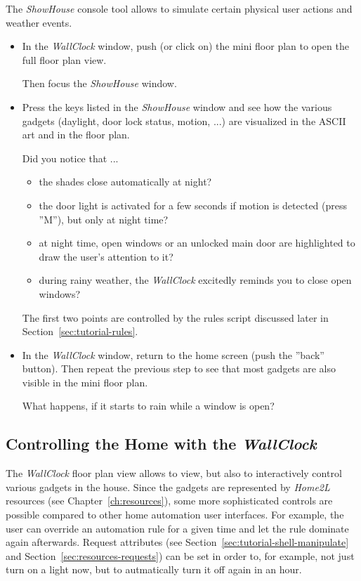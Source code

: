 \documentclass[12pt,english,parskip=half,headheight=19pt]{scrreprt}
\begin{document}
The \textit{ShowHouse} console tool allows to simulate certain physical user actions and weather events.

\begin{itemize}[$\blacktriangleright$]

  \item
    In the \textit{WallClock} window, push (or click on) the mini floor plan to open the full floor
    plan view.

    Then focus the \textit{ShowHouse} window.

  \item
    Press the keys listed in the \textit{ShowHouse} window and see how the various gadgets
    (daylight, door lock status, motion, ...) are visualized in the ASCII art and in the floor plan.

    Did you notice that ...
    \begin{itemize}
      \item the shades close automatically at night?
      \item the door light is activated for a few seconds if motion is detected (press ''M''),
        but only at night time?
      \item at night time, open windows or an unlocked main door are highlighted to draw the
        user's attention to it?
      \item during rainy weather, the \textit{WallClock} excitedly reminds you to close open windows?
    \end{itemize}

    The first two points are controlled by the rules script discussed later in
    Section~\ref{sec:tutorial-rules}.

  \item
    In the \textit{WallClock} window, return to the home screen (push the ''back'' button).
    Then repeat the previous step to see that most gadgets are also visible in the
    mini floor plan.

    What happens, if it starts to rain while a window is open?

\end{itemize}


\subsection{Controlling the Home with the \textit{WallClock}}
\label{sec:tutorial-firststeps-dialogs}

The \textit{WallClock} floor plan view allows to view, but also to interactively control various
gadgets in the house. Since the gadgets are represented by \textit{Home2L} resources
(see Chapter~\ref{ch:resources}), some more sophisticated controls are possible compared to other
home automation user interfaces. For example, the user can override an automation rule for a given time
and let the rule dominate again afterwards. Request attributes (see Section~\ref{sec:tutorial-shell-manipulate}
and Section~\ref{sec:resources-requests}) can be set in order to, for example, not just turn on a light now,
but to autmatically turn it off again in an hour.
\end{document}

